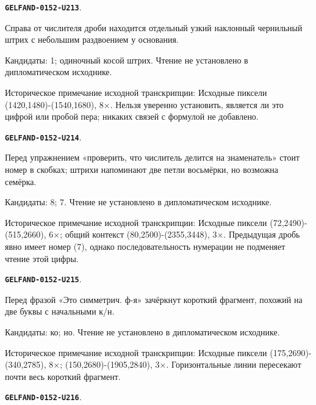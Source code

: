 \documentclass[11pt]{article}
\theoremstyle{definition}
\theoremstyle{remark}
\begin{document}
\par\noindent\leavevmode{}\label{GELFAND-0152-U213}\label{GELFAND-P001400:right-of-numerator:note}\textbf{\texttt{GELFAND-0152-U213}}.\nopagebreak[4]\par
Справа от числителя дроби находится отдельный узкий наклонный чернильный штрих с небольшим раздвоением у основания.\par
Кандидаты: 1; одиночный косой штрих. Чтение не установлено в дипломатическом исходнике.\par
Историческое примечание исходной транскрипции: Исходные пиксели (1420,1480)-(1540,1680), 8×. Нельзя уверенно установить, является ли это цифрой или пробой пера; никаких связей с формулой не добавлено.\par\medskip
\par\noindent\leavevmode{}\label{GELFAND-0152-U214}\label{GELFAND-P001400:exercise-number:note}\textbf{\texttt{GELFAND-0152-U214}}.\nopagebreak[4]\par
Перед упражнением «проверить, что числитель делится на знаменатель» стоит номер в скобках; штрихи напоминают две петли восьмёрки, но возможна семёрка.\par
Кандидаты: 8; 7. Чтение не установлено в дипломатическом исходнике.\par
Историческое примечание исходной транскрипции: Исходные пиксели (72,2490)-(515,2660), 6×; общий контекст (80,2500)-(2355,3448), 3×. Предыдущая дробь явно имеет номер (7), однако последовательность нумерации не подменяет чтение этой цифры.\par\medskip
\par\noindent\leavevmode{}\label{GELFAND-0152-U215}\label{GELFAND-P001400:cancelled-before-eto:note}\textbf{\texttt{GELFAND-0152-U215}}.\nopagebreak[4]\par
Перед фразой «Это симметрич. ф-я» зачёркнут короткий фрагмент, похожий на две буквы с начальными к/н.\par
Кандидаты: ко; но. Чтение не установлено в дипломатическом исходнике.\par
Историческое примечание исходной транскрипции: Исходные пиксели (175,2690)-(340,2785), 8×; (150,2680)-(1905,2840), 3×. Горизонтальные линии пересекают почти весь короткий фрагмент.\par\medskip
\par\noindent\leavevmode{}\label{GELFAND-0152-U216}\label{GELFAND-P001400:cancelled-right-word:note}\textbf{\texttt{GELFAND-0152-U216}}.\nopagebreak[4]\par
\end{document}
